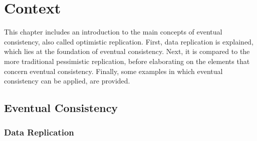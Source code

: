 \documentclass[a4paper,12pt]{report}
\begin{document}
\chapter{Context}\label{cha:Context} %

This chapter includes an introduction to the main concepts of eventual consistency, also called optimistic replication. First, data replication is explained, which lies at the foundation of eventual consistency. Next, it is compared to the more traditional pessimistic replication, before elaborating on the elements that concern eventual consistency. Finally, some examples in which eventual consistency can be applied, are provided.

\section{Eventual Consistency}\label{sec:EventualConsistency}


\subsection{Data Replication}
\end{document}
